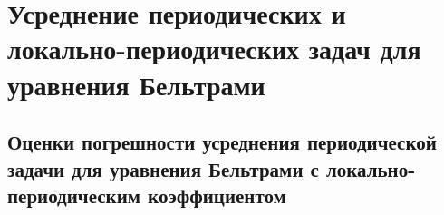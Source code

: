 
\chapter{Усреднение периодических и локально-периодических задач для уравнения Бельтрами}\label{SMM}

\section{Оценки погрешности усреднения периодической задачи для уравнения Бельтрами с локально-периодическим коэффициентом}

%
%
%



